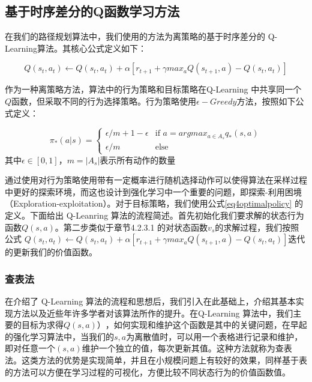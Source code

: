 \documentclass{standalone}
\begin{document}
\subsection{基于时序差分的Q函数学习方法}
在我们的路径规划算法中，我们使用的方法为离策略的基于时序差分的 Q-Learning算法。其核心公式定义如下：
\begin{center}
    \begin{equation}
        Q(s_t, a_t) \leftarrow Q(s_t, a_t) + \alpha[r_{t+1} + \gamma max_{a}Q(s_{t+1}, a) - Q(s_t, a_t)]
    \end{equation}
\end{center}
作为一种离策略方法，算法中的行为策略和目标策略在Q-Learning 中共享同一个$Q$函数，但采取不同的行为选择策略。行为策略使用$\epsilon-Greedy$方法，按照如下公式定义：
\begin{center}
    \begin{equation}
    \pi_{*}(a|s) = \begin{cases}
    \epsilon / m + 1 - \epsilon &\mbox{if $a = argmax_{a \in A_s}q_{*}(s, a)$}\\
    \epsilon / m &\mbox{else}
    \end{cases}
    \end{equation}
    \mbox{其中$\epsilon \in [0, 1]$，$m=|A_s|$表示所有动作的数量}
\end{center}
通过使用对行为策略使用带有一定概率进行随机选择动作可以使得算法在采样过程中更好的探索环境，而这也设计到强化学习中一个重要的问题，即探索-利用困境（Exploration-exploitation）。对于目标策略，我们使用公式\ref{eq4optimalpolicy} 的定义。下面给出 Q-Leanring 算法的流程简述。首先初始化我们要求解的状态行为函数$Q(s, a)$。第二步类似于章节4.2.3.1 的对状态函数$v_{s}$的求解过程，我们按照公式 $Q(s_t, a_t) \leftarrow Q(s_t, a_t) + \alpha[r_{t+1} + \gamma max_{a}Q(s_{t+1}, a) - Q(s_t, a_t)]$迭代的更新我们的价值函数。
\subsubsection{查表法}
在介绍了 Q-Learning 算法的流程和思想后，我们引入在此基础上，介绍其基本实现方法以及近些年许多学者对该算法所作的提升。在Q-Learning 算法中，我们主要的目标为求得$Q(s, a)）$，如何实现和维护这个函数是其中的关键问题，在早起的强化学习算法中，当我们的$s, a$为离散值时，可以用一个表格进行记录和维护，即对任意一个$(s, a)$维护一个独立的值，每次更新其值。这种方法就称为查表法。这类方法的优势是实现简单，并且在小规模问题上有较好的效果，同样基于表的方法可以方便在学习过程的可视化，方便比较不同状态行为的价值函数值。
\end{document}
